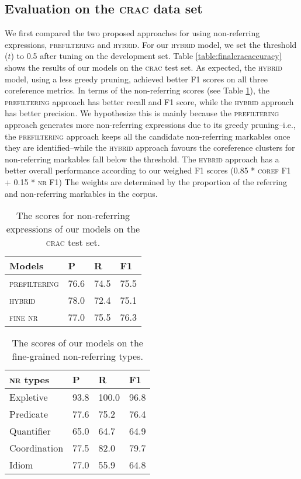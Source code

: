 \documentclass[10pt, a4paper]{article}
\newcommand{\ACRO}[1]{\textsc{#1}}
\newcommand{\CRAC}{\ACRO{crac}}
\newcommand{\NR}{\ACRO{nr}}
\newcommand{\PREFILTERING}{\ACRO{prefiltering}}
\newcommand{\HYBRID}{\ACRO{hybrid}}
\newcommand{\FINENR}{\ACRO{fine nr}}
\begin{document}
\subsection{Evaluation on the {\CRAC} data set}

We first compared the two proposed approaches for using non-referring expressions, {\PREFILTERING} and {\HYBRID}.  
For our {\HYBRID} model, we set the threshold ($t$) to 0.5 after tuning on the development set. Table \ref{table:finalcracaccuracy} shows the results of our models on the {\CRAC} test set. 
As expected, the {\HYBRID} model,  using a less greedy pruning, achieved better F1 scores on all three coreference metrics. 
In terms of the non-referring scores (see Table \ref{table:cracnraccuracy}), the {\PREFILTERING} approach has better recall and F1 score, while the {\HYBRID} approach has better precision. 
We hypothesize this is mainly because the {\PREFILTERING} approach generates more non-referring expressions due to its greedy pruning--i.e., the {\PREFILTERING} approach keeps all the candidate non-referring markables once they are identified--while the {\HYBRID} approach  favours  the coreference clusters for non-referring markables fall below the threshold. 
The {\HYBRID} approach has a better overall performance according to our weighed F1 scores (0.85 * \ACRO{coref} F1 + 0.15 * {\NR} F1) The weights are determined by the proportion of the referring and non-referring markables in the corpus.



\begin{table}[t]
\centering
\small
\begin{tabular}{l l l l}
\toprule
Models& P&R&F1\\\midrule
{\PREFILTERING}&76.6&74.5&75.5\\ {\HYBRID}&78.0&72.4&75.1\\{\FINENR}&77.0&75.5&76.3\\
\bottomrule
\end{tabular}
\caption{\label{table:cracnraccuracy} The  scores for non-referring expressions of our models on the {\CRAC} test set.}
\end{table}

\begin{table}[t]
\centering
\small
\begin{tabular}{l l l l}
\toprule
{\NR} types& P&R&F1\\ \midrule
Expletive&93.8&100.0&96.8 \\Predicate&77.6&75.2&76.4 \\Quantifier&65.0&64.7&64.9 \\Coordination&77.5&82.0&79.7 \\Idiom&77.0&55.9&64.8 \\\bottomrule
\end{tabular}
\caption{\label{table:finenraccuracy} The scores of our models on the fine-grained non-referring types.}
\end{table}
\end{document}
